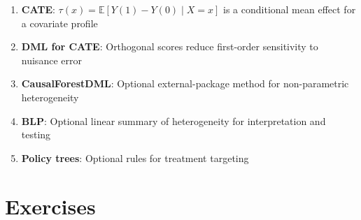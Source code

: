\begin{enumerate}
    \item \textbf{CATE}: $\tau(x) = \mathbb{E}[Y(1) - Y(0) \mid X = x]$ is a conditional mean effect for a covariate profile
    \item \textbf{DML for CATE}: Orthogonal scores reduce first-order sensitivity to nuisance error
    \item \textbf{CausalForestDML}: Optional external-package method for non-parametric heterogeneity
    \item \textbf{BLP}: Optional linear summary of heterogeneity for interpretation and testing
    \item \textbf{Policy trees}: Optional rules for treatment targeting
\end{enumerate}



\section{Exercises}\label{sec:ch09_exercises}

